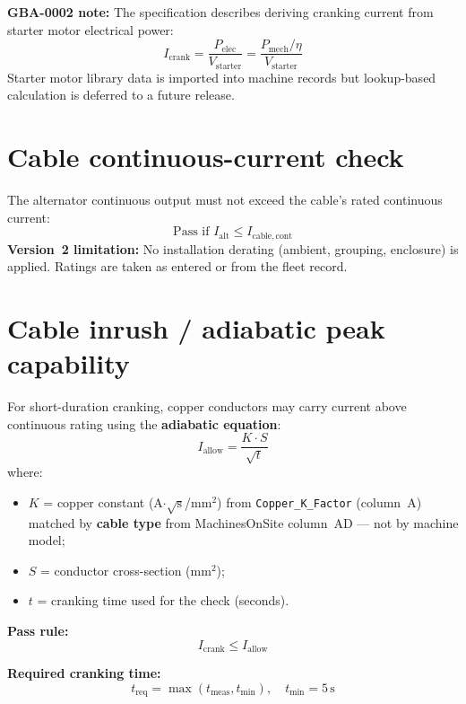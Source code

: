 \documentclass[11pt,a4paper]{report}
\begin{document}
\textbf{GBA-0002 note:} The specification describes deriving cranking current from starter motor electrical power:
\begin{equation}
  I_\mathrm{crank} = \frac{P_\mathrm{elec}}{V_\mathrm{starter}}
  = \frac{P_\mathrm{mech}/\eta}{V_\mathrm{starter}}
\end{equation}
Starter motor library data is imported into machine records but lookup-based calculation is deferred to a future release.

\section{Cable continuous-current check}

The alternator continuous output must not exceed the cable's rated continuous current:
\begin{equation}
  \text{Pass if } I_\mathrm{alt} \leq I_\mathrm{cable,cont}
\end{equation}
\textbf{Version~2 limitation:} No installation derating (ambient, grouping, enclosure) is applied. Ratings are taken as entered or from the fleet record.

\section{Cable inrush / adiabatic peak capability}

For short-duration cranking, copper conductors may carry current above continuous rating using the \textbf{adiabatic equation}:
\begin{equation}
  I_\mathrm{allow} = \frac{K \cdot S}{\sqrt{t}}
  \label{eq:adiabatic}
\end{equation}
where:
\begin{itemize}[noitemsep]
  \item $K$ = copper constant (A$\cdot\sqrt{\mathrm{s}}$/mm$^2$) from \texttt{Copper\_K\_Factor} (column~A) matched by \textbf{cable type} from MachinesOnSite column~AD --- not by machine model;
  \item $S$ = conductor cross-section (mm$^2$);
  \item $t$ = cranking time used for the check (seconds).
\end{itemize}

\textbf{Pass rule:}
\begin{equation}
  I_\mathrm{crank} \leq I_\mathrm{allow}
\end{equation}

\textbf{Required cranking time:}
\begin{equation}
  t_\mathrm{req} = \max(t_\mathrm{meas}, t_\mathrm{min}), \quad t_\mathrm{min} = 5\,\mathrm{s}
\end{equation}
\end{document}
